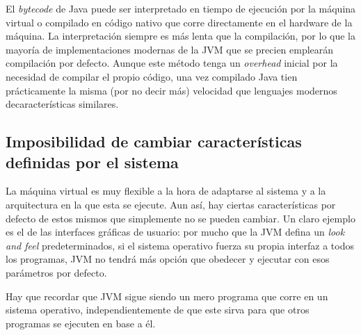 \documentclass[english,runningheads,a4paper]{llncs}[2018/03/10]
\begin{document}
El \textit{bytecode} de Java puede ser interpretado en tiempo de ejecución por
la máquina virtual o compilado en código nativo que corre directamente en el
hardware de la máquina. La interpretación siempre es más lenta que la
compilación, por lo que la mayoría de implementaciones modernas de la JVM que se
precien emplearán compilación por defecto. Aunque este método tenga un
\textit{overhead} inicial por la necesidad de compilar el propio código, una vez
compilado Java tien prácticamente la misma (por no decir más) velocidad que 
lenguajes modernos decaracterísticas similares.

\subsection*{Imposibilidad de cambiar características definidas por el sistema}
La máquina virtual es muy flexible a la hora de adaptarse al sistema y a la
arquitectura en la que esta se ejecute. Aun así, hay ciertas características por
defecto de estos mismos que simplemente no se pueden cambiar. Un claro ejemplo
es el de las interfaces gráficas de usuario: por mucho que la JVM defina un
\textit{look and feel} predeterminados, si el sistema operativo fuerza su propia
interfaz a todos los programas, JVM no tendrá más opción que obedecer y ejecutar
con esos parámetros por defecto.

Hay que recordar que JVM sigue siendo un mero programa que corre en un sistema
operativo, independientemente de que este sirva para que otros programas se
ejecuten en base a él.

\newpage
\printbibliography
\end{document}
